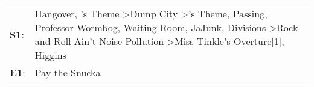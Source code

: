 \begin{supertabular}{p{0.03\textwidth}p{0.92\textwidth}}
 \textbf{S1}:  &  Hangover\textsuperscript{}, 's Theme\textsuperscript{} \textgreater \enspace Dump City\textsuperscript{} \textgreater {}'s Theme\textsuperscript{}, \enspace Passing\textsuperscript{}, \enspace Professor Wormbog\textsuperscript{}, \enspace Waiting Room\textsuperscript{}, \enspace JaJunk\textsuperscript{}, \enspace Divisions\textsuperscript{} \textgreater \enspace Rock and Roll Ain't Noise Pollution\textsuperscript{} \textgreater \enspace Miss Tinkle's Overture[1]\textsuperscript{}, \enspace Higgins\textsuperscript{}  \enspace  \\
 \textbf{E1}:  &                                                                                                                                                                                                                                                                                                                                                                                                                                                                                                                              Pay the Snucka\textsuperscript{}  \enspace  \\
\end{supertabular}
